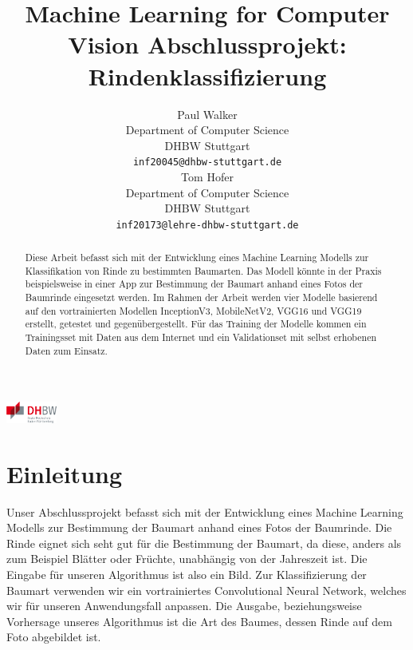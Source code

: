 \documentclass{article}
\title{Machine Learning for Computer Vision Abschlussprojekt: Rindenklassifizierung}
\author{
  Paul Walker\\
  Department of Computer Science\\
  DHBW Stuttgart\\
  \texttt{inf20045@dhbw-stuttgart.de} \\
  \And
  Tom Hofer\\
  Department of Computer Science\\
  DHBW Stuttgart\\
  \texttt{inf20173@lehre-dhbw-stuttgart.de} \\
}
\begin{document}
\begin{center}
\includegraphics[height=0.7cm]{DHBW_logo}
\end{center}

\maketitle

\begin{abstract}
  Diese Arbeit befasst sich mit der Entwicklung eines Machine Learning Modells zur Klassifikation von Rinde zu bestimmten Baumarten. Das Modell könnte in der Praxis beispielsweise in einer App zur Bestimmung der Baumart anhand eines Fotos der Baumrinde eingesetzt werden. Im Rahmen der Arbeit werden vier Modelle basierend auf den vortrainierten Modellen InceptionV3, MobileNetV2, VGG16 und VGG19 erstellt, getestet und gegenübergestellt. Für das Training der Modelle kommen ein Trainingsset mit Daten aus dem Internet und ein Validationset mit selbst erhobenen Daten zum Einsatz.
\end{abstract}

\section{Einleitung}
Unser Abschlussprojekt befasst sich mit der Entwicklung eines Machine Learning Modells zur Bestimmung der Baumart anhand eines Fotos der Baumrinde. Die Rinde eignet sich seht gut für die Bestimmung der Baumart, da diese, anders als zum Beispiel Blätter oder Früchte, unabhängig von der Jahreszeit ist. Die Eingabe für unseren Algorithmus ist also ein Bild. Zur Klassifizierung der Baumart verwenden wir ein vortrainiertes Convolutional Neural Network, welches wir für unseren Anwendungsfall anpassen. Die Ausgabe, beziehungsweise Vorhersage unseres Algorithmus ist die Art des Baumes, dessen Rinde auf dem Foto abgebildet ist.
\end{document}
